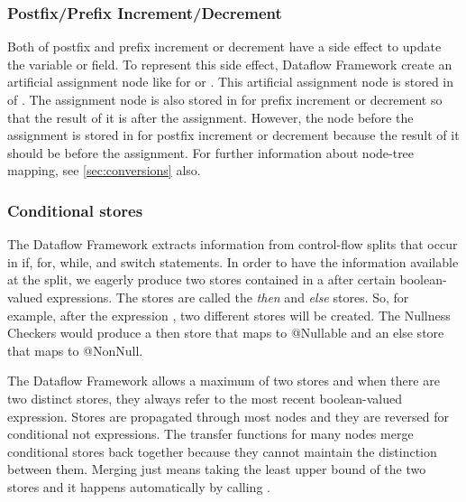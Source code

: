 
\subsubsection{Postfix/Prefix Increment/Decrement}
\label{sec:postpre-incdec}
Both of postfix and prefix increment or decrement have a side effect to
update the variable or field. To represent this side effect, Dataflow
Framework create an artificial assignment node like 
for  or . This artificial assignment node is stored
in  of . The assignment
node is also stored in  for prefix increment or decrement
so that the result of it is after the assignment. However, the node before
the assignment is stored in  for postfix increment or decrement
because the result of it should be before the assignment. For further information
about node-tree mapping, see \autoref{sec:conversions} also.

\subsubsection{Conditional stores}
\label{sec:cond-stores}

The Dataflow Framework extracts information from control-flow splits
that occur in if, for, while, and switch statements.  In order to have
the information available at the split, we eagerly produce two stores
contained in a  after certain
boolean-valued expressions.  The stores are called the \emph{then} and
\emph{else} stores.  So, for example, after the expression , two different stores will be created.  The Nullness Checkers
would produce a then store that maps  to @Nullable and an else
store that maps  to @NonNull.

The Dataflow Framework allows a maximum of two stores and when there
are two distinct stores, they always refer to the most recent
boolean-valued expression.  Stores are propagated through most nodes
and they are reversed for conditional not expressions.  The transfer
functions for many nodes merge conditional stores back together
because they cannot maintain the distinction between them.  Merging
just means taking the least upper bound of the two stores and it
happens automatically by calling .


